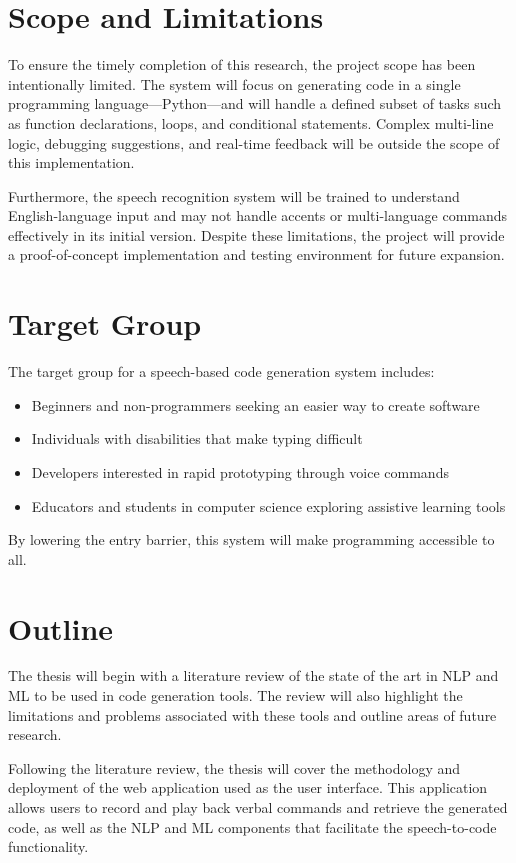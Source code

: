 \section{Scope and Limitations}

To ensure the timely completion of this research, the project scope has been intentionally limited. The system will focus on generating code in a single programming language—Python—and will handle a defined subset of tasks such as function declarations, loops, and conditional statements. Complex multi-line logic, debugging suggestions, and real-time feedback will be outside the scope of this implementation.

Furthermore, the speech recognition system will be trained to understand English-language input and may not handle accents or multi-language commands effectively in its initial version. Despite these limitations, the project will provide a proof-of-concept implementation and testing environment for future expansion.

\section{Target Group}

The target group for a speech-based code generation system includes:
\begin{itemize}
    \item Beginners and non-programmers seeking an easier way to create software
    \item Individuals with disabilities that make typing difficult
    \item Developers interested in rapid prototyping through voice commands
    \item Educators and students in computer science exploring assistive learning tools
\end{itemize}

By lowering the entry barrier, this system will make programming accessible to all. 

\section{Outline}

The thesis will begin with a literature review of the state of the art in NLP and ML to be used in code generation tools. The review will also highlight the limitations and problems associated with these tools and outline areas of future research.

Following the literature review, the thesis will cover the methodology and deployment of the web application used as the user interface. This application allows users to record and play back verbal commands and retrieve the generated code, as well as the NLP and ML components that facilitate the speech-to-code functionality.

